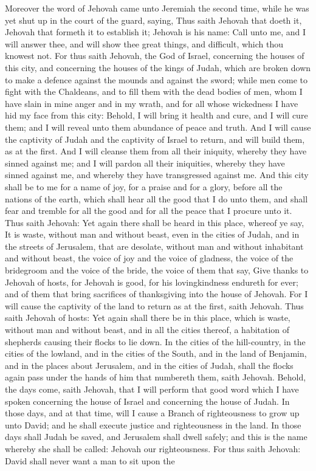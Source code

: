 Moreover the word of Jehovah came unto Jeremiah the second time, while he was yet shut up in the court of the guard, saying, Thus saith Jehovah that doeth it, Jehovah that formeth it to establish it; Jehovah is his name: Call unto me, and I will answer thee, and will show thee great things, and difficult, which thou knowest not. For thus saith Jehovah, the God of Israel, concerning the houses of this city, and concerning the houses of the kings of Judah, which are broken down to make a defence against the mounds and against the sword; while men come to fight with the Chaldeans, and to fill them with the dead bodies of men, whom I have slain in mine anger and in my wrath, and for all whose wickedness I have hid my face from this city: Behold, I will bring it health and cure, and I will cure them; and I will reveal unto them abundance of peace and truth. And I will cause the captivity of Judah and the captivity of Israel to return, and will build them, as at the first. And I will cleanse them from all their iniquity, whereby they have sinned against me; and I will pardon all their iniquities, whereby they have sinned against me, and whereby they have transgressed against me. And this city shall be to me for a name of joy, for a praise and for a glory, before all the nations of the earth, which shall hear all the good that I do unto them, and shall fear and tremble for all the good and for all the peace that I procure unto it.  Thus saith Jehovah: Yet again there shall be heard in this place, whereof ye say, It is waste, without man and without beast, even in the cities of Judah, and in the streets of Jerusalem, that are desolate, without man and without inhabitant and without beast, the voice of joy and the voice of gladness, the voice of the bridegroom and the voice of the bride, the voice of them that say, Give thanks to Jehovah of hosts, for Jehovah is good, for his lovingkindness endureth for ever; and of them that bring sacrifices of thanksgiving into the house of Jehovah. For I will cause the captivity of the land to return as at the first, saith Jehovah.  Thus saith Jehovah of hosts: Yet again shall there be in this place, which is waste, without man and without beast, and in all the cities thereof, a habitation of shepherds causing their flocks to lie down. In the cities of the hill-country, in the cities of the lowland, and in the cities of the South, and in the land of Benjamin, and in the places about Jerusalem, and in the cities of Judah, shall the flocks again pass under the hands of him that numbereth them, saith Jehovah.  Behold, the days come, saith Jehovah, that I will perform that good word which I have spoken concerning the house of Israel and concerning the house of Judah. In those days, and at that time, will I cause a Branch of righteousness to grow up unto David; and he shall execute justice and righteousness in the land. In those days shall Judah be saved, and Jerusalem shall dwell safely; and this is the name whereby she shall be called: Jehovah our righteousness. For thus saith Jehovah: David shall never want a man to sit upon the 